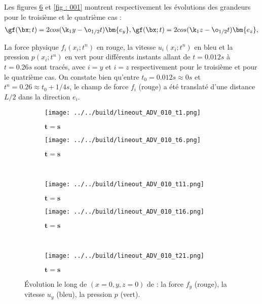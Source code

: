 Les figures \ref{fig : 010} et \ref{fig : 001} montrent respectivement les évolutions des grandeurs pour le troisième et le quatrième cas :
\begin{align}
\gf(\bx;t) = 2cos(\k_1 y - \o_{1/2}t) \bm{e_y},
\gf(\bx;t) = 2cos(\k_1 z - \o_{1/2}t) \bm{e_z},
\end{align} 

La force physique $f_i(x_i;t^n)$ en rouge, la vitesse $u_i(x_i;t^n)$ en bleu et la pression $p(x_i;t^n)$ en vert pour différents instants allant de $t=0.012s$ à $t=0.26s$ sont tracés, avec $i=y$ et $i=z$ respectivement pour le troisième et pour le quatrième cas. On constate bien qu'entre $t_0=0.012s \approx 0s$ et $t^n = 0.26 \approx t_0 + 1/4 s$, le champ de force $f_i$ (rouge) a été translaté d'une distance $L/2$ dans la direction $e_i$. 

\begin{figure}
\begin{center}
	\begin{subfigure}[t]{0.4\textwidth}                                                                                                                                   
		\texttt{[image: ../../build/lineout\_ADV\_010\_t1.png]}
		\caption{ $\bm{t=s}$}
		\label{fig : 010_t1}
	\end{subfigure}\hfill
	\begin{subfigure}[t]{0.4\textwidth}
		\texttt{[image: ../../build/lineout\_ADV\_010\_t6.png]}
		\caption{ $\bm{t=s}$}
		\label{fig : 010_t6}
	\end{subfigure}
\\
	\begin{subfigure}[t]{0.4\textwidth}
		\texttt{[image: ../../build/lineout\_ADV\_010\_t11.png]}
		\caption{ $\bm{t=s}$}
		\label{fig : 010_t11}
	\end{subfigure}\hfill
	\begin{subfigure}[t]{0.4\textwidth}
		\texttt{[image: ../../build/lineout\_ADV\_010\_t16.png]}
		\caption{ $\bm{t=s}$}
		\label{fig : 010_t16}
	\end{subfigure}
\\
	\begin{subfigure}[t]{0.4\textwidth}
		\texttt{[image: ../../build/lineout\_ADV\_010\_t21.png]}
		\caption{ $\bm{t=s}$}
		\label{fig : 010_t21}
	\end{subfigure}	
\end{center}
\caption{Évolution le long de $(x=0,y,z=0)$ de : la force $f_y$ (rouge), la vitesse $u_y$ (bleu), la pression $p$ (vert).}
\label{fig : 010}
\end{figure}

